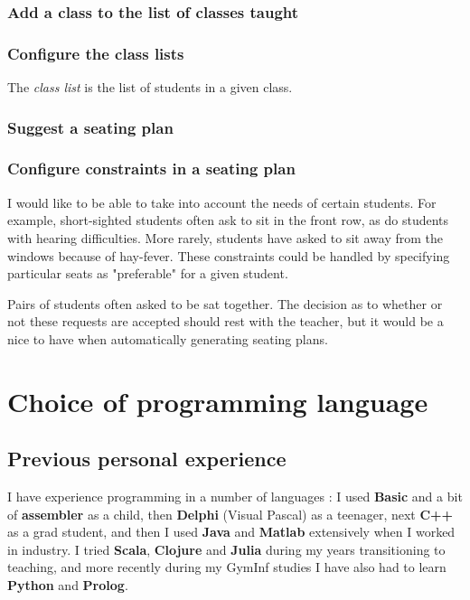 \documentclass[10pt]{article}
\begin{document}
\subsubsection{Add a class to the list of classes taught}

\subsubsection{Configure the class lists}
The \emph{class list} is the list of students in a given class.

\subsubsection{Suggest a seating plan}

\subsubsection{Configure constraints in a seating plan}
I would like to be able to take into account the needs of certain students. For example, short-sighted students often ask to sit in the front row, as do students with hearing difficulties. More rarely, students have asked to sit away from the windows because of hay-fever. These constraints could be handled by specifying particular seats as "preferable" for a given student.

Pairs of students often asked to be sat together. The decision as to whether or not these requests are accepted should rest with the teacher, but it would be a nice to have when automatically generating seating plans.


\section{Choice of programming language} \label{language}

\subsection{Previous personal experience}

I have experience programming in a number of languages : I used \textbf{Basic} and a bit of \textbf{assembler} as a child, then \textbf{Delphi} (Visual Pascal) as a teenager, next \textbf{C++} as a grad student, and then I used \textbf{Java} and \textbf{Matlab} extensively when I worked in industry. I tried \textbf{Scala}, \textbf{Clojure} and \textbf{Julia} during my years transitioning to teaching, and more recently during my GymInf studies I have also had to learn \textbf{Python} and \textbf{Prolog}.
\end{document}
